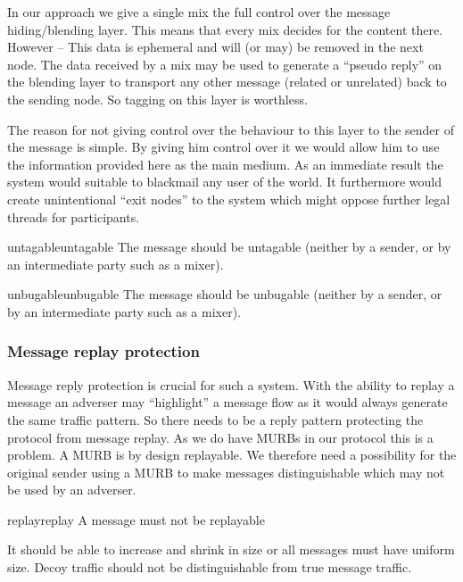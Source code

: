 In our approach we give a single mix the full control over the message hiding/blending layer. This means that every mix decides for the content there. However -- This data is ephemeral and will (or may) be removed in the next node. The data received by a mix may be used to generate a ``pseudo reply'' on the blending layer to transport any other message (related or unrelated) back to the sending node. So tagging on this layer is worthless.

The reason for not giving control over the behaviour to this layer to the sender of the message is simple. By giving him control over it we would allow him to use the information provided here as the main medium. As an immediate result the system would suitable to blackmail any user of the world. It furthermore would create unintentional ``exit nodes'' to the system which might oppose further legal threads for participants.

\begin{requirement}{untagable}{untagable}
	The message should be untagable (neither by a sender, or by an intermediate party such as a mixer).
\end{requirement}

\begin{requirement}{unbugable}{unbugable}
	The message should be unbugable (neither by a sender, or by an intermediate party such as a mixer).
\end{requirement}

\subsubsection{Message replay protection}
Message reply protection is crucial for such a system. With the ability to replay a message an adverser may ``highlight'' a message flow as it would always generate the same traffic pattern. So there needs to be a reply pattern protecting the protocol from message replay. As we do have MURBs in our protocol this is a problem. A MURB is by design replayable. We therefore need a possibility for the original sender using a MURB to make messages distinguishable which may not be used by an adverser.

\begin{requirement}{replay}{replay}
	A message must not be replayable
\end{requirement}

It should be able to increase and shrink in size or all messages must have uniform size. Decoy traffic should not be distinguishable from true message traffic. 

